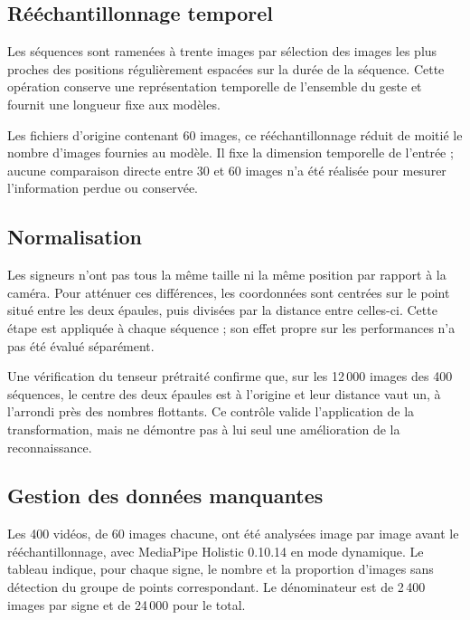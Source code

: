 \subsection{Rééchantillonnage temporel}

Les séquences sont ramenées à trente images par sélection des images les plus proches des positions régulièrement espacées sur la durée de la séquence. Cette opération conserve une représentation temporelle de l'ensemble du geste et fournit une longueur fixe aux modèles.

Les fichiers d'origine contenant 60 images, ce rééchantillonnage réduit de moitié le nombre d'images fournies au modèle. Il fixe la dimension temporelle de l'entrée ; aucune comparaison directe entre 30 et 60 images n'a été réalisée pour mesurer l'information perdue ou conservée.

\subsection{Normalisation}

Les signeurs n'ont pas tous la même taille ni la même position par rapport à la caméra. Pour atténuer ces différences, les coordonnées sont centrées sur le point situé entre les deux épaules, puis divisées par la distance entre celles-ci. Cette étape est appliquée à chaque séquence ; son effet propre sur les performances n'a pas été évalué séparément.

Une vérification du tenseur prétraité confirme que, sur les 12\,000 images des 400 séquences, le centre des deux épaules est à l'origine et leur distance vaut un, à l'arrondi près des nombres flottants. Ce contrôle valide l'application de la transformation, mais ne démontre pas à lui seul une amélioration de la reconnaissance.

\subsection{Gestion des données manquantes}

Les 400 vidéos, de 60 images chacune, ont été analysées image par image avant le rééchantillonnage, avec MediaPipe Holistic 0.10.14 en mode dynamique. Le tableau indique, pour chaque signe, le nombre et la proportion d'images sans détection du groupe de points correspondant. Le dénominateur est de 2\,400 images par signe et de 24\,000 pour le total.

